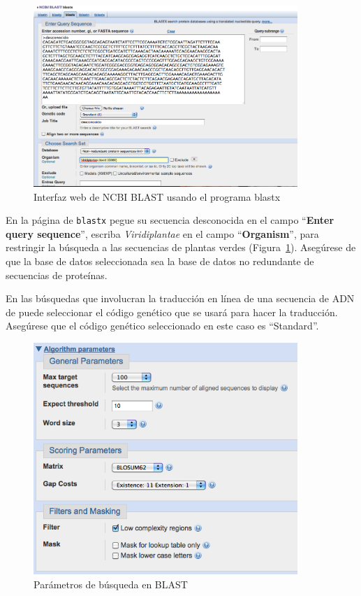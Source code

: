 \documentclass[letter,11pt]{book}
\begin{document}
\begin{figure}[h!]
\centering
   \includegraphics[width=10cm]{Figs/blastx_input.png}
  \caption{\label{blastx_input}Interfaz web de NCBI BLAST usando el programa blastx}
\end{figure}

En la página de \Verb+blastx+ pegue su secuencia desconocida en el campo ``\textbf{Enter query sequence}'', escriba \textit{Viridiplantae} en el campo ``\textbf{Organism}'', para restringir la búsqueda a las secuencias de plantas verdes (Figura~\ref{blastx_input}). Asegúrese de que la base de datos seleccionada sea la base de datos no redundante de secuencias de proteínas.

En las búsquedas que involucran la traducción en línea de una secuencia de ADN de puede seleccionar el código genético que se usará para hacer la traducción. Asegúrese que el código genético seleccionado en este caso es ``Standard''.

\begin{figure}[h!]
\centering
   \includegraphics[width=10cm]{Figs/blastx_parameters.png}
  \caption{\label{blastx_parameters}Parámetros de búsqueda en BLAST}
\end{figure}
\end{document}
